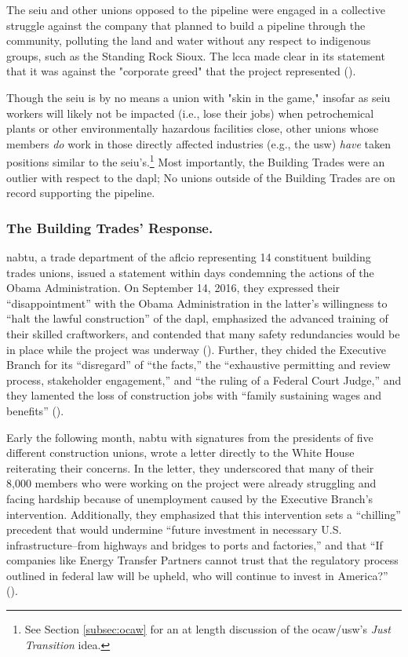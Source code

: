 \documentclass[12pt]{article}
\begin{document}
The \acrshort{seiu} and other unions opposed to the pipeline were engaged in a collective struggle against the company that planned to build a pipeline through the community, polluting the land and water without any respect to indigenous groups, such as the Standing Rock Sioux. The \acrshort{lcca} made clear in its statement that it was against the "corporate greed" that the project represented (\cite{apalaAFLCIOConstituencyGroups2016}). 

Though the \acrshort{seiu} is by no means a union with "skin in the game," insofar as \acrshort{seiu} workers will likely not be impacted (i.e., lose their jobs) when petrochemical plants or other environmentally hazardous facilities close, other unions whose members \emph{do} work in those directly affected industries (e.g., the \acrshort{usw}) \emph{have} taken positions similar to the \acrshort{seiu}'s.\footnote{See Section \ref{subsec:ocaw} for an at length discussion of the \acrshort{ocaw}/\acrshort{usw}'s \textit{Just Transition} idea.} Most importantly, the Building Trades were an outlier with respect to the \acrshort{dapl}; No unions outside of the Building Trades are on record supporting the pipeline.

\subsubsection{The Building Trades' Response.}

\acrfull{nabtu}, a trade department of the \acrshort{aflcio} representing 14 constituent building trades unions, issued a statement within days condemning the actions of the Obama Administration. On September 14, 2016, they expressed their “disappointment” with the Obama Administration in the latter’s willingness to “halt the lawful construction” of the \acrshort{dapl}, emphasized the advanced training of their skilled craftworkers, and contended that many safety redundancies would be in place while the project was underway  (\cite{nabtuStatementObamaAdministration2016}). Further, they chided the Executive Branch for its “disregard” of “the facts,” the “exhaustive permitting and review process, stakeholder engagement,” and “the ruling of a Federal Court Judge,” and they lamented the loss of construction jobs with “family sustaining wages and benefits” (\cite{nabtuStatementObamaAdministration2016}).

Early the following month, \acrshort{nabtu} with signatures from the presidents of five different construction unions, wrote a letter directly to the White House reiterating their concerns. In the letter, they underscored that many of their 8,000 members who were working on the project were already struggling and facing hardship because of unemployment caused by the Executive Branch’s intervention. Additionally, they emphasized that this intervention sets a “chilling” precedent that would undermine “future investment in necessary U.S. infrastructure–from highways and bridges to ports and factories,” and that “If companies like Energy Transfer Partners cannot trust that the regulatory process outlined in federal law will be upheld, who will continue to invest in America?” (\cite{callahanLetterObama2016}).
\end{document}
